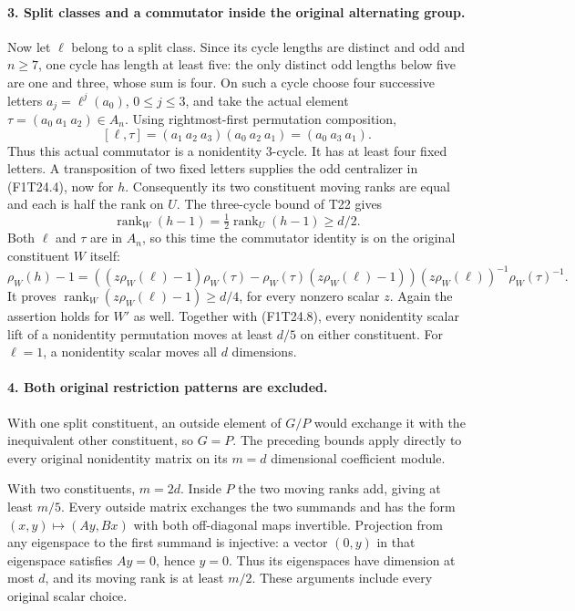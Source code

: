 \paragraph{3. Split classes and a commutator inside the original alternating group.}
Now let \(\ell\) belong to a split class. Since
its cycle lengths are distinct and odd and
\(n\ge7\), one cycle has length at least five:
the only distinct odd lengths below five are
one and three, whose sum is four. On such a cycle
choose four successive letters
\(a_j=\ell^j(a_0)\), \(0\le j\le3\), and
take the actual element
\(\tau=(a_0\ a_1\ a_2)\in A_n\).
Using rightmost-first permutation composition,
\[
 [\ell,\tau]
   =(a_1\ a_2\ a_3)(a_0\ a_2\ a_1)
   =(a_0\ a_3\ a_1).
 \tag{F1T24.9}
\]
Thus this actual commutator is a nonidentity
3-cycle. It has at least four fixed letters.
A transposition of two fixed letters supplies
the odd centralizer in (F1T24.4), now for \(h\).
Consequently its two constituent moving ranks
are equal and each is half the rank on \(U\).
The three-cycle bound of T22 gives
\[
 \operatorname{rank}_W(h-1)
      =\tfrac12\operatorname{rank}_U(h-1)\ge d/2.
 \tag{F1T24.10}
\]
Both \(\ell\) and \(\tau\) are in \(A_n\),
so this time the commutator identity is on the
original constituent \(W\) itself:
\[
 \rho_W(h)-1=
 ((z\rho_W(\ell)-1)\rho_W(\tau)
 -\rho_W(\tau)(z\rho_W(\ell)-1))
       (z\rho_W(\ell))^{-1}\rho_W(\tau)^{-1}.
 \tag{F1T24.11}
\]
It proves
\(\operatorname{rank}_W(z\rho_W(\ell)-1)
\ge d/4\), for every nonzero scalar \(z\).
Again the assertion holds for \(W'\) as well.
Together with (F1T24.8), every nonidentity
scalar lift of a nonidentity permutation moves
at least \(d/5\) on either constituent.
For \(\ell=1\), a nonidentity scalar moves
all \(d\) dimensions.

\paragraph{4. Both original restriction patterns are excluded.}
With one split constituent, an outside element
of \(G/P\) would exchange it with the
inequivalent other constituent, so \(G=P\).
The preceding bounds apply directly to every
original nonidentity matrix on its \(m=d\)
dimensional coefficient module.

With two constituents, \(m=2d\). Inside \(P\)
the two moving ranks add, giving at least
\(m/5\). Every outside matrix exchanges the
two summands and has the form
\((x,y)\mapsto(Ay,Bx)\) with both off-diagonal
maps invertible. Projection from any eigenspace
to the first summand is injective: a vector
\((0,y)\) in that eigenspace satisfies
\(Ay=0\), hence \(y=0\).
Thus its eigenspaces have dimension at most
\(d\), and its moving rank is at least
\(m/2\). These arguments include every original
scalar choice.

